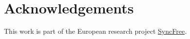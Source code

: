 \documentclass[english]{article}
\begin{document}
\section{Acknowledgements}
This work is part of the European research project \href{https://syncfree.lip6.fr}{SyncFree}.


%

%
%


\printglossaries
\end{document}

